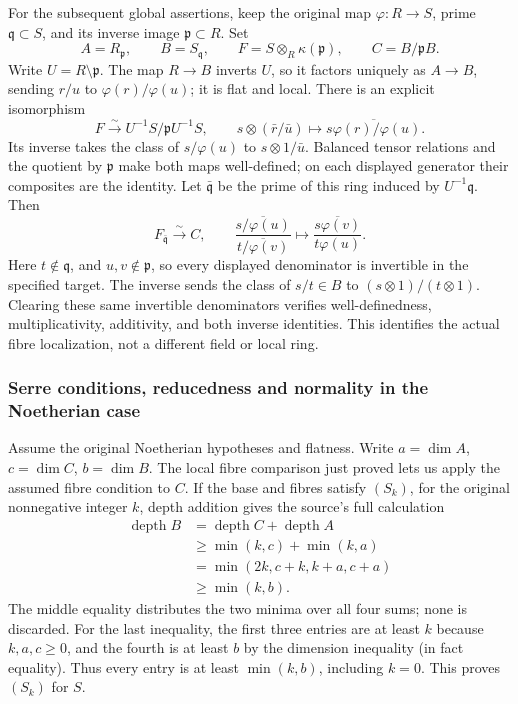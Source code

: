 For the subsequent global assertions, keep the original map \(\varphi:R\to S\), prime \(\mathfrak q\subset S\), and its inverse image \(\mathfrak p\subset R\). Set \[
 A=R_{\mathfrak p},\qquad B=S_{\mathfrak q},\qquad
 F=S\otimes_R\kappa(\mathfrak p),\qquad C=B/\mathfrak pB.
\] Write \(U=R\setminus\mathfrak p\). The map \(R\to B\) inverts \(U\), so it factors uniquely as \(A\to B\), sending \(r/u\) to \(\varphi(r)/\varphi(u)\); it is flat and local. There is an explicit isomorphism \[
 F\xrightarrow{\sim}U^{-1}S/\mathfrak pU^{-1}S,
 \qquad s\otimes(\bar r/\bar u)\longmapsto
 \overline{s\varphi(r)/\varphi(u)}.
\] Its inverse takes the class of \(s/\varphi(u)\) to \(s\otimes1/\bar u\). Balanced tensor relations and the quotient by \(\mathfrak p\) make both maps well-defined; on each displayed generator their composites are the identity. Let \(\bar{\mathfrak q}\) be the prime of this ring induced by \(U^{-1}\mathfrak q\). Then \[
 F_{\bar{\mathfrak q}}\xrightarrow{\sim}C,
 \qquad
 \frac{\overline{s/\varphi(u)}}{\overline{t/\varphi(v)}}
 \longmapsto\overline{\frac{s\varphi(v)}{t\varphi(u)}}.
\] Here \(t\notin\mathfrak q\), and \(u,v\notin\mathfrak p\), so every displayed denominator is invertible in the specified target. The inverse sends the class of \(s/t\in B\) to \((s\otimes1)/(t\otimes1)\). Clearing these same invertible denominators verifies well-definedness, multiplicativity, additivity, and both inverse identities. This identifies the actual fibre localization, not a different field or local ring.

\subsubsection{Serre conditions, reducedness and normality in the Noetherian case}\label{algebra-proof-068-serre-conditions-reducedness-and-normality-in-the-noetherian-case}

Assume the original Noetherian hypotheses and flatness. Write \(a=\dim A\), \(c=\dim C\), \(b=\dim B\). The local fibre comparison just proved lets us apply the assumed fibre condition to \(C\). If the base and fibres satisfy \((S_k)\), for the original nonnegative integer \(k\), depth addition gives the source's full calculation \[
 \begin{aligned}
 \operatorname{depth}B
 &=\operatorname{depth}C+\operatorname{depth}A\\
 &\ge\min(k,c)+\min(k,a)\\
 &=\min(2k,c+k,k+a,c+a)\\
 &\ge\min(k,b).
 \end{aligned}
\] The middle equality distributes the two minima over all four sums; none is discarded. For the last inequality, the first three entries are at least \(k\) because \(k,a,c\ge0\), and the fourth is at least \(b\) by the dimension inequality (in fact equality). Thus every entry is at least \(\min(k,b)\), including \(k=0\). This proves \((S_k)\) for \(S\).

